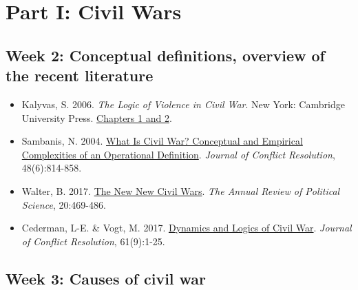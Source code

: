 \documentclass[12pt,]{article}
\providecommand{\tightlist}{%
  \setlength{\itemsep}{0pt}\setlength{\parskip}{0pt}}
\begin{document}
\hypertarget{part-i-civil-wars}{%
\section{Part I: Civil Wars}\label{part-i-civil-wars}}

\hypertarget{week-2-conceptual-definitions-overview-of-the-recent-literature}{%
\subsection{Week 2: Conceptual definitions, overview of the recent
literature}\label{week-2-conceptual-definitions-overview-of-the-recent-literature}}

\begin{itemize}
\tightlist
\item
  Kalyvas, S. 2006. \emph{The Logic of Violence in Civil War}. New York:
  Cambridge University Press.
  \href{https://github.com/danilofreire/pols1824w/blob/master/readings/kalyvas2006chap1-2.pdf}{Chapters
  1 and 2}.
\item
  Sambanis, N. 2004.
  \href{http://journals.sagepub.com/doi/abs/10.1177/0022002704269355}{What
  Is Civil War? Conceptual and Empirical Complexities of an Operational
  Definition}. \emph{Journal of Conflict Resolution}, 48(6):814-858.
\item
  Walter, B. 2017.
  \href{https://www.annualreviews.org/doi/abs/10.1146/annurev-polisci-060415-093921}{The
  New New Civil Wars}. \emph{The Annual Review of Political Science},
  20:469-486.
\item
  Cederman, L-E. \& Vogt, M. 2017.
  \href{http://journals.sagepub.com/doi/abs/10.1177/0022002717721385}{Dynamics
  and Logics of Civil War}. \emph{Journal of Conflict Resolution},
  61(9):1-25.
\end{itemize}

\hypertarget{week-3-causes-of-civil-war}{%
\subsection{Week 3: Causes of civil
war}\label{week-3-causes-of-civil-war}}
\end{document}
